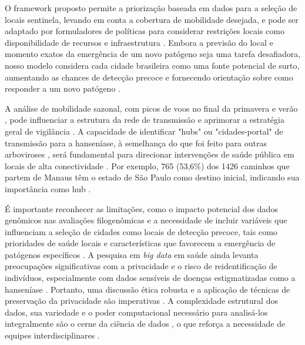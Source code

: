 \documentclass[preprint,12pt]{elsarticle}
\begin{document}
O framework proposto permite a priorização baseada em dados para a seleção de locais sentinela, levando em conta a cobertura de mobilidade desejada, e pode ser adaptado por formuladores de políticas para considerar restrições locais como disponibilidade de recursos e infraestrutura \cite{oliveira2024ranking, oliveira2024improvements}. Embora a previsão do local e momento exatos da emergência de um novo patógeno seja uma tarefa desafiadora, nosso modelo considera cada cidade brasileira como uma fonte potencial de surto, aumentando as chances de detecção precoce e fornecendo orientação sobre como responder a um novo patógeno \cite{oliveira2024emerging}.

A análise de mobilidade sazonal, com picos de voos no final da primavera e verão \cite{oliveira2024findings}, pode influenciar a estrutura da rede de transmissão e aprimorar a estratégia geral de vigilância \cite{oliveira2024improvements, inovacao2024modelagem}. A capacidade de identificar "hubs" ou "cidades-portal" de transmissão para a hanseníase, à semelhança do que foi feito para outras arboviroses \cite{inovacao2024modelagem, lima2022temporal}, será fundamental para direcionar intervenções de saúde pública em locais de alta conectividade \cite{inovacao2024modelagem}. Por exemplo, 765 (53,6\%) dos 1426 caminhos que partem de Manaus têm o estado de São Paulo como destino inicial, indicando sua importância como hub \cite{oliveira2024manaos}.

É importante reconhecer as limitações, como o impacto potencial dos dados genômicos nas avaliações filogenômicas e a necessidade de incluir variáveis que influenciam a seleção de cidades como locais de detecção precoce, tais como prioridades de saúde locais e características que favorecem a emergência de patógenos específicos \cite{oliveira2024improvements}. A pesquisa em \textit{big data} em saúde ainda levanta preocupações significativas com a privacidade e o risco de reidentificação de indivíduos, especialmente com dados sensíveis de doenças estigmatizadas como a hanseníase \cite{inovacao2024desafios, mooney2018big, saldanha2021vinculacao}. Portanto, uma discussão ética robusta e a aplicação de técnicas de preservação da privacidade são imperativas \cite{inovacao2024desafios, mooney2018big, saldanha2021conservadorismo}. A complexidade estrutural dos dados, sua variedade e o poder computacional necessário para analisá-los integralmente são o cerne da ciência de dados \cite{saldanha2021definicao}, o que reforça a necessidade de equipes interdisciplinares \cite{saldanha2021nesse, tang2021fields}.
\end{document}

